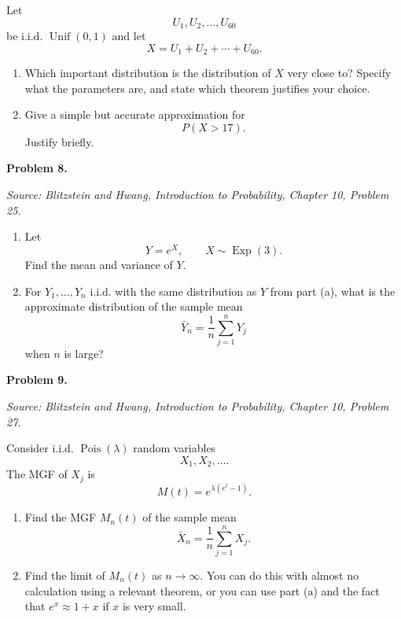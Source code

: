 \documentclass[11pt]{article}
\newcommand{\source}[2]{%
    \vspace{0.15cm}
    {\small\textit{Source: Blitzstein and Hwang, \textit{Introduction to Probability}, Chapter #1, Problem #2.}}
}
\begin{document}
Let
\[
U_1,U_2,\dots,U_{60}
\]
be i.i.d. $\operatorname{Unif}(0,1)$ and let
\[
X=U_1+U_2+\cdots+U_{60}.
\]

\begin{enumerate}[label=(\alph*), leftmargin=*]
    \item Which important distribution is the distribution of $X$ very close to? Specify what the parameters are, and state which theorem justifies your choice.

    \item Give a simple but accurate approximation for
    \[
    P(X>17).
    \]
    Justify briefly.
\end{enumerate}
 
\newpage


\begin{problemheader}
\textbf{Problem 8.}
\end{problemheader}
\source{10}{25}

\begin{enumerate}[label=(\alph*), leftmargin=*]
    \item Let
    \[
    Y=e^X,
    \qquad
    X\sim \operatorname{Exp}(3).
    \]
    Find the mean and variance of $Y$.

    \item For $Y_1,\dots,Y_n$ i.i.d. with the same distribution as $Y$ from part (a), what is the approximate distribution of the sample mean
    \[
    \bar Y_n=\frac1n\sum_{j=1}^{n}Y_j
    \]
    when $n$ is large?
\end{enumerate}
 
\newpage


\begin{problemheader}
\textbf{Problem 9. }
\end{problemheader}
\source{10}{27}

Consider i.i.d. $\operatorname{Pois}(\lambda)$ random variables
\[
X_1,X_2,\dots.
\]
The MGF of $X_j$ is
\[
M(t)=e^{\lambda(e^t-1)}.
\]

\begin{enumerate}[label=(\alph*), leftmargin=*]
    \item Find the MGF $M_n(t)$ of the sample mean
    \[
    \bar X_n=\frac1n\sum_{j=1}^{n}X_j.
    \]

    \item Find the limit of $M_n(t)$ as $n\to\infty$. You can do this with almost no calculation using a relevant theorem, or you can use part (a) and the fact that $e^x\approx 1+x$ if $x$ is very small.
\end{enumerate}
 
\end{document}
